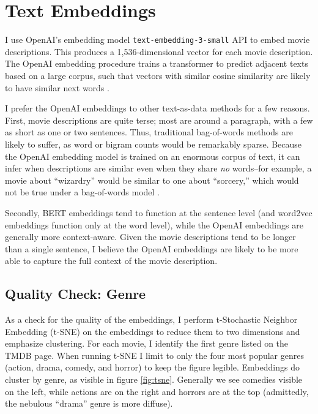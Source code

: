 \documentclass{article}
\begin{document}
\section{Text Embeddings}

I use OpenAI's embedding model \texttt{text-embedding-3-small} API to embed movie descriptions. This produces a 1,536-dimensional vector for each movie description. The OpenAI embedding procedure trains a transformer to predict adjacent texts based on a large corpus, such that vectors with similar cosine similarity are likely to have similar next words \parencite{neelakantan2022ao, kusupati2022ao}.

I prefer the OpenAI embeddings to other text-as-data methods for a few reasons. First, movie descriptions are quite terse; most are around a paragraph, with a few as short as one or two sentences. Thus, traditional bag-of-words methods are likely to suffer, as word or bigram counts would be remarkably sparse. Because the OpenAI embedding model is trained on an enormous corpus of text, it can infer when descriptions are similar even when they share \emph{no} words--for example, a movie about ``wizardry'' would be similar to one about ``sorcery,'' which would not be true under a bag-of-words model \parencite{brown2020a}.

Secondly, BERT embeddings tend to function at the sentence level (and word2vec embeddings function only at the word level), while the OpenAI embeddings are generally more context-aware. Given the movie descriptions tend to be longer than a single sentence, I believe the OpenAI embeddings are likely to be more able to capture the full context of the movie description.


\subsection{Quality Check: Genre}

As a check for the quality of the embeddings, I perform t-Stochastic Neighbor Embedding (t-SNE) on the embeddings to reduce them to two dimensions and emphasize clustering. For each movie, I identify the first genre listed on the TMDB page. When running t-SNE I limit to only the four most popular genres (action, drama, comedy, and horror) to keep the figure legible. Embeddings do cluster by genre, as visible in figure \ref{fig:tsne}. Generally we see comedies visible on the left, while actions are on the right and horrors are at the top (admittedly, the nebulous ``drama'' genre is more diffuse).
\end{document}
